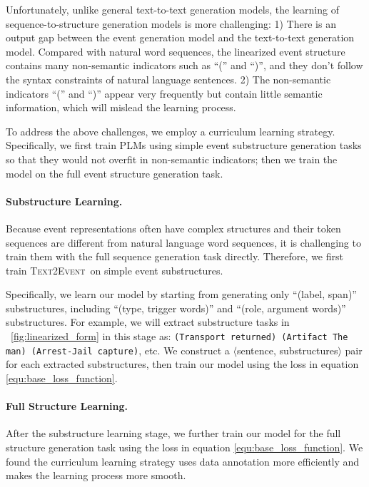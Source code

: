 \documentclass[11pt,a4paper]{article}
\newcommand\modelname{\textsc{Text2Event}}
\begin{document}
Unfortunately, unlike general text-to-text generation models, the learning of sequence-to-structure generation models is more challenging:
1) There is an output gap between the event generation model and the text-to-text generation model.
Compared with natural word sequences, the linearized event structure contains many non-semantic indicators such as ``('' and ``)'', and they don't follow the syntax constraints of natural language sentences.
2) The non-semantic indicators ``('' and ``)'' appear very frequently but contain little semantic information, which will mislead the learning process. 

To address the above challenges, we employ a curriculum learning \citep{icml2009_006,xu-etal-2020-curriculum} strategy.
Specifically, we first train PLMs using simple event substructure generation tasks so that they would not overfit in non-semantic indicators;
then we train the model on the full event structure generation task.

\paragraph{Substructure Learning.}
Because event representations often have complex structures and their token sequences are different from natural language word sequences, it is challenging to train them with the full sequence generation task directly.
Therefore, we first train \modelname\, on simple event substructures.

Specifically, we learn our model by starting from generating only ``(label, span)'' substructures, including ``(type, trigger words)'' and ``(role, argument words)'' substructures.
For example, we will extract substructure tasks in \figurename~\ref{fig:linearized_form} in this stage as: \texttt{(Transport returned) (Artifact The man) (Arrest-Jail capture)}, etc.
We construct a $\langle$sentence, substructures$\rangle$ pair for each extracted substructures, then train our model using the loss in equation \ref{equ:base_loss_function}.

\paragraph{Full Structure Learning.}
After the substructure learning stage, we further train our model for the full structure generation task using the loss in equation \ref{equ:base_loss_function}.
We found the curriculum learning strategy uses data annotation more efficiently and makes the learning process more smooth.
 
\end{document}
